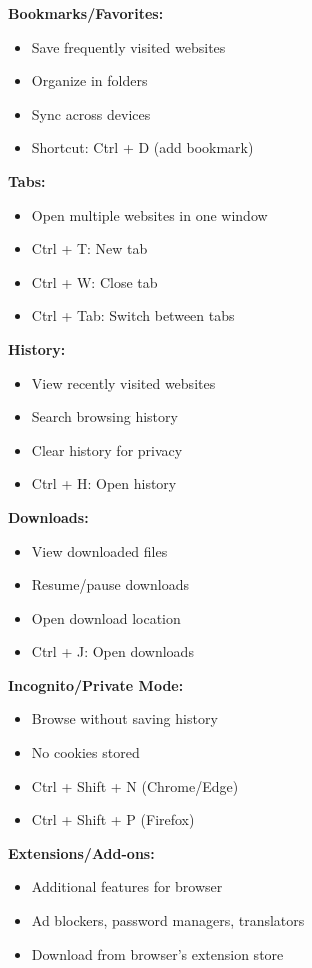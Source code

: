 \documentclass[12pt,a4paper]{article}
\begin{document}
\textbf{Bookmarks/Favorites:}
\begin{itemize}
    \item Save frequently visited websites
    \item Organize in folders
    \item Sync across devices
    \item Shortcut: Ctrl + D (add bookmark)
\end{itemize}

\textbf{Tabs:}
\begin{itemize}
    \item Open multiple websites in one window
    \item Ctrl + T: New tab
    \item Ctrl + W: Close tab
    \item Ctrl + Tab: Switch between tabs
\end{itemize}

\textbf{History:}
\begin{itemize}
    \item View recently visited websites
    \item Search browsing history
    \item Clear history for privacy
    \item Ctrl + H: Open history
\end{itemize}

\textbf{Downloads:}
\begin{itemize}
    \item View downloaded files
    \item Resume/pause downloads
    \item Open download location
    \item Ctrl + J: Open downloads
\end{itemize}

\textbf{Incognito/Private Mode:}
\begin{itemize}
    \item Browse without saving history
    \item No cookies stored
    \item Ctrl + Shift + N (Chrome/Edge)
    \item Ctrl + Shift + P (Firefox)
\end{itemize}

\textbf{Extensions/Add-ons:}
\begin{itemize}
    \item Additional features for browser
    \item Ad blockers, password managers, translators
    \item Download from browser's extension store
\end{itemize}
\end{document}
